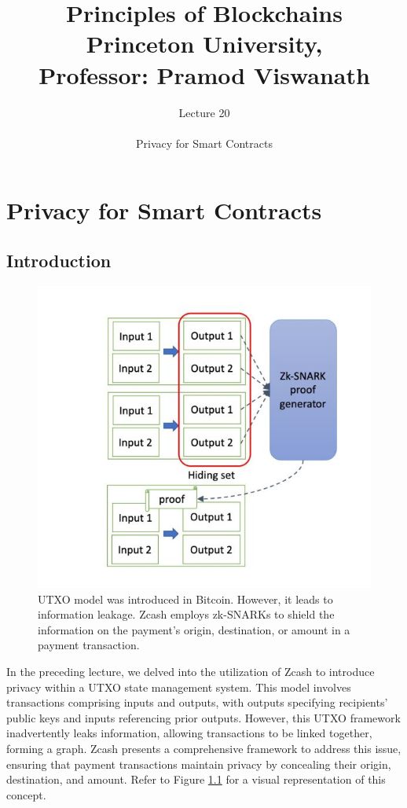 \documentclass{report}
\title{\Huge{Principles of Blockchains \\ Princeton University,\\
		Professor: Pramod Viswanath}}
\author{\huge{Lecture 20} \\\\ Privacy for Smart Contracts}
\begin{document}
\maketitle
\newpage%
\tableofcontents
\pagebreak

\chapter{Privacy for Smart Contracts}
\section{Introduction}
\begin{center}
	\begin{figure}
		\centering
		\includegraphics[width=0.8\linewidth]{Fig/F1}
		\caption{UTXO model was introduced in Bitcoin. However, it leads to information leakage. Zcash employs zk-SNARKs to shield the information on the payment’s origin, destination, or amount in a payment transaction.}
		\label{fig:f1}
	\end{figure}
\end{center}
In the preceding lecture, we delved into the utilization of Zcash to introduce privacy within a UTXO state management system. This model involves transactions comprising inputs and outputs, with outputs specifying recipients' public keys and inputs referencing prior outputs. However, this UTXO framework inadvertently leaks information, allowing transactions to be linked together, forming a graph. Zcash presents a comprehensive framework to address this issue, ensuring that payment transactions maintain privacy by concealing their origin, destination, and amount. Refer to Figure \ref{fig:f1} for a visual representation of this concept.\\
\end{document}
